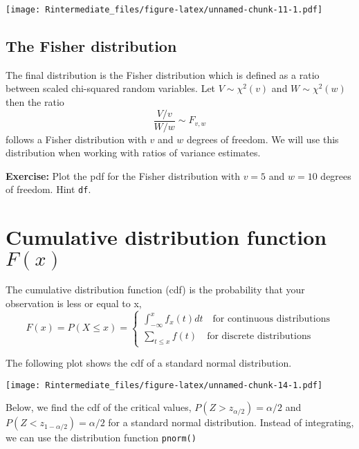 \documentclass[]{article}
\begin{document}
\texttt{[image: Rintermediate\_files/figure-latex/unnamed-chunk-11-1.pdf]}

\subsection{The Fisher distribution}\label{the-fisher-distribution}

The final distribution is the Fisher distribution which is defined as a
ratio between scaled chi-squared random variables. Let
\(V\sim \chi^2(v)\) and \(W\sim \chi^2(w)\) then the ratio
\[\frac{V/v}{W/w}\sim F_{v,w}\] follows a Fisher distribution with \(v\)
and \(w\) degrees of freedom. We will use this distribution when working
with ratios of variance estimates.

\textbf{Exercise:} Plot the pdf for the Fisher distribution with \(v=5\)
and \(w=10\) degrees of freedom. Hint \texttt{df}.

\begingroup\color{dg}

\endgroup

\section{\texorpdfstring{Cumulative distribution function
\(F(x)\)}{Cumulative distribution function F(x)}}\label{cumulative-distribution-function-fx}

The cumulative distribution function (cdf) is the probability that your
observation is less or equal to x, \[F(x) = P(X\leq x) = 
\begin{cases} \int_{-\infty}^{x} f_x(t)dt \quad \text{for continuous distributions}\\
\sum_{t\leq x} f(t) \quad \text{for discrete distributions}
\end{cases}\]

The following plot shows the cdf of a standard normal distribution.

\texttt{[image: Rintermediate\_files/figure-latex/unnamed-chunk-14-1.pdf]}

Below, we find the cdf of the critical values,
\(P(Z>z_{\alpha/2}) = \alpha/2\) and \(P(Z<z_{1-\alpha/2}) = \alpha/2\)
for a standard normal distribution. Instead of integrating, we can use
the distribution function \texttt{pnorm()}
\end{document}
